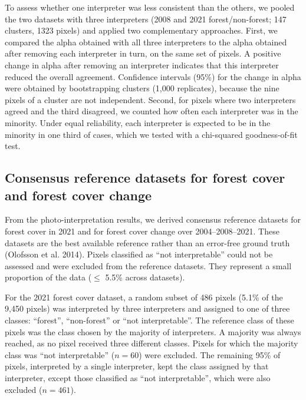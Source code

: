 \documentclass[paper=a4, fontsize=12pt, DIV=13, english, dvipsnames]{scrartcl}
\makeatletter
\newcommand{\cslcitation}[2]
 {\protect\hyper@linkstart{cite}{citeproc_bib_item_#1}#2\hyper@linkend}
\makeatother
\begin{document}
To assess whether one interpreter was less consistent than the others, we pooled the two datasets with three interpreters (2008 and 2021 forest/non-forest; 147 clusters, 1323 pixels) and applied two complementary approaches. First, we compared the alpha obtained with all three interpreters to the alpha obtained after removing each interpreter in turn, on the same set of pixels. A positive change in alpha after removing an interpreter indicates that this interpreter reduced the overall agreement. Confidence intervals (95\%) for the change in alpha were obtained by bootstrapping clusters (1,000 replicates), because the nine pixels of a cluster are not independent. Second, for pixels where two interpreters agreed and the third disagreed, we counted how often each interpreter was in the minority. Under equal reliability, each interpreter is expected to be in the minority in one third of cases, which we tested with a chi-squared goodness-of-fit test.
\subsection{Consensus reference datasets for forest cover and forest cover change}
\label{sec:orgbbcaf0c}

From the photo-interpretation results, we derived consensus reference datasets for forest cover in 2021 and for forest cover change over 2004--2008--2021. These datasets are the best available reference rather than an error-free ground truth (\cslcitation{9}{Olofsson et al. 2014}). Pixels classified as ``not interpretable'' could not be assessed and were excluded from the reference datasets. They represent a small proportion of the data (\(\leq\) 5.5\% across datasets).

For the 2021 forest cover dataset, a random subset of 486 pixels (5.1\% of the 9,450 pixels) was interpreted by three interpreters and assigned to one of three classes: ``forest'', ``non-forest'' or ``not interpretable''. The reference class of these pixels was the class chosen by the majority of interpreters. A majority was always reached, as no pixel received three different classes. Pixels for which the majority class was ``not interpretable'' (\(n = 60\)) were excluded. The remaining 95\% of pixels, interpreted by a single interpreter, kept the class assigned by that interpreter, except those classified as ``not interpretable'', which were also excluded (\(n = 461\)).
\end{document}
